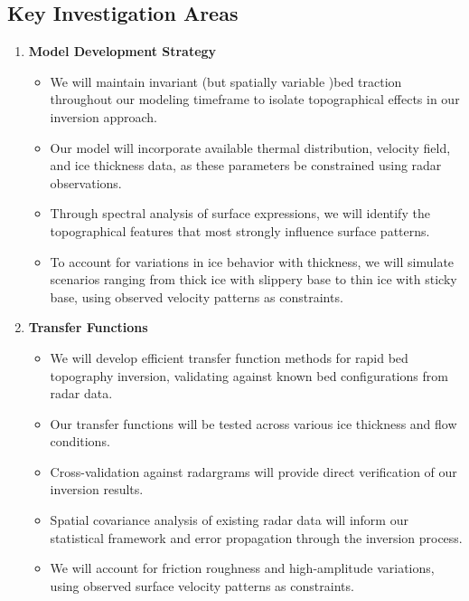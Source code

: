 \subsection*{Key Investigation Areas}
\begin{enumerate}
\item\textbf{Model Development Strategy}
    \begin{itemize}
    \item We will maintain invariant (but spatially variable )bed traction throughout our modeling timeframe to isolate topographical effects in our inversion approach.
    
    \item Our model will incorporate available thermal distribution, velocity field, and ice thickness data, as these parameters be constrained using radar observations.
    
    \item Through spectral analysis of surface expressions, we will identify the topographical features that most strongly influence surface patterns.
    
    \item To account for variations in ice behavior with thickness, we will simulate scenarios ranging from thick ice with slippery base to thin ice with sticky base, using observed velocity patterns as constraints.
    \end{itemize}

\item\textbf{Transfer Functions}
    \begin{itemize}
    \item We will develop efficient transfer function methods for rapid bed topography inversion, validating against known bed configurations from radar data.
    
    \item Our transfer functions will be tested across various ice thickness and flow conditions.
    
    \item Cross-validation against radargrams will provide direct verification of our inversion results.
    
    \item Spatial covariance analysis of existing radar data will inform our statistical framework and error propagation through the inversion process.
    
    \item We will account for friction roughness and high-amplitude variations, using observed surface velocity patterns as constraints.
    \end{itemize}


\end{enumerate}
